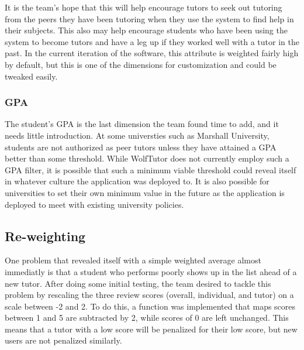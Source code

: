 It is the team's hope that this will help encourage tutors to seek out tutoring
from the peers they have been tutoring when they use the system to find help in
their subjects. This also may help encourage students who have been using the
system to become tutors and have a leg up if they worked well with a tutor in
the past.  In the current iteration of the software, this attribute is weighted
fairly high by default, but this is one of the dimensions for customization and
could be tweaked easily.  

\subsubsection{GPA}
The student's GPA is the last dimension the team found time to add, and it needs
little introduction. At some universties such as Marshall University, students
are not authorized as peer tutors unless they have attained a GPA better than
some threshold. While WolfTutor does not currently employ such a GPA filter, it
is possible that such a minimum viable threshold could reveal itself in whatever
culture the application was deployed to.  It is also possible for universities
to set their own minimum value in the future as the application is deployed to
meet with existing university policies.

\subsection{Re-weighting}
One problem that revealed itself with a simple weighted average almost
immediatly is that a student who performs poorly shows up in the list ahead of a
new tutor.  After doing some initial testing, the team desired to tackle this
problem by rescaling the three review scores (overall, individual, and tutor) on
a scale between -2 and 2.  To do this, a function was implemented that maps
scores between 1 and 5 are subtracted by 2, while scores of 0 are left
unchanged.  This means that a tutor with a low score will be penalized for their
low score, but new users are not penalized similarly.

